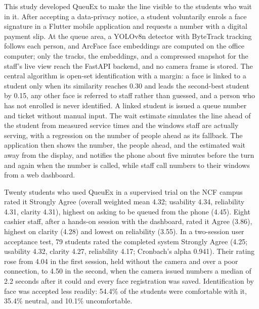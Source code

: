 \documentclass{research}
\newcommand{\sysname}{QueuEx}
\begin{document}
This study developed \sysname{} to make the line visible to the
students who wait in it. After accepting a data-privacy notice, a
student voluntarily enrols a face signature in a Flutter mobile
application and requests a number with a digital payment slip. At the
queue area, a YOLOv8n detector with ByteTrack tracking follows each
person, and ArcFace face embeddings are computed on the office computer;
only the tracks, the embeddings, and a compressed snapshot for the
staff's live view reach the FastAPI backend, and no camera frame is
stored. The central algorithm is open-set identification with a margin:
a face is linked to a student only when its similarity reaches 0.30 and
leads the second-best student by 0.15, any other face is referred to
staff rather than guessed, and a person who has not enrolled is never
identified. A linked student is issued a queue number and ticket without
manual input. The wait estimate simulates the line ahead of the student
from measured service times and the windows staff are actually serving,
with a regression on the number of people ahead as its fallback. The
application then shows the number, the people ahead, and the estimated
wait away from the display, and notifies the phone about five minutes
before the turn and again when the number is called, while staff call
numbers to their windows from a web dashboard.

Twenty students who used \sysname{} in a supervised trial on the NCF
campus rated it Strongly Agree (overall weighted mean 4.32; usability
4.34, reliability 4.31, clarity 4.31), highest on asking to be queued
from the phone (4.45). Eight cashier staff, after a hands-on session
with the dashboard, rated it Agree (3.86), highest on clarity (4.28) and
lowest on reliability (3.55). In a two-session user acceptance test, 79
students rated the completed system Strongly Agree (4.25; usability
4.32, clarity 4.27, reliability 4.17; Cronbach's alpha 0.941). Their
rating rose from 4.04 in the first session, held without the camera and
over a poor connection, to 4.50 in the second, when the camera issued
numbers a median of 2.2 seconds after it could and every face
registration was saved. Identification by face was accepted less
readily: 54.4\% of the students were comfortable with it, 35.4\%
neutral, and 10.1\% uncomfortable.
\end{document}
